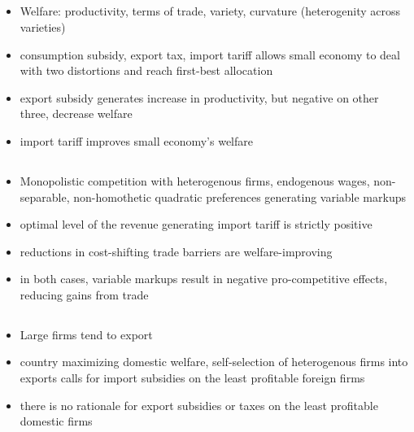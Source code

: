 \documentclass[10pt]{article} %
\begin{document}
    \subsection{\cite{MartinMejeanParenti2023}}

    \subsection{\cite{DemidovaRodriguezClare2009}}
    \begin{itemize}
        \item Welfare: productivity, terms of trade, variety, curvature (heterogenity across varieties)
        \item consumption subsidy, export tax, import tariff allows small economy to deal with two distortions and reach first-best allocation
        \item export subsidy generates increase in productivity, but negative on other three, decrease welfare
        \item import tariff improves small economy's welfare
    \end{itemize}

    \subsection{\cite{Demidova2017}}
    \begin{itemize}
        \item Monopolistic competition with heterogenous firms, endogenous wages, non-separable, non-homothetic quadratic preferences generating variable markups
        \item optimal level of the revenue generating import tariff is strictly positive
        \item reductions in cost-shifting trade barriers are welfare-improving
        \item in both cases, variable markups result in negative pro-competitive effects, reducing gains from trade
    \end{itemize}

    \subsection{\cite{CostinotRodriguezClareIvan2020}}
    \begin{itemize}
        \item Large firms tend to export
        \item country maximizing domestic welfare, self-selection of heterogenous firms into exports calls for import subsidies on the least profitable foreign firms
        \item there is no rationale for export subsidies or taxes on the least profitable domestic firms
    \end{itemize}
\end{document}
